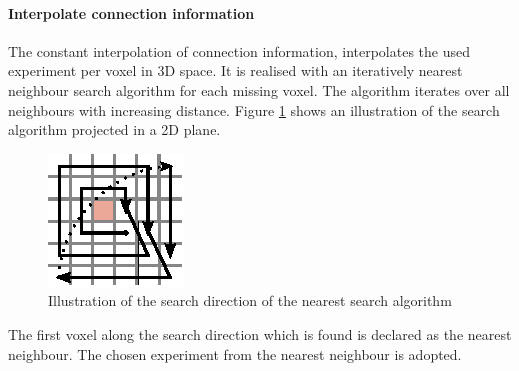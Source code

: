 \paragraph{Interpolate connection information}
\label{par:interpolation}
The constant interpolation of connection information, interpolates the used experiment per voxel in 3D space.
It is realised with an iteratively nearest neighbour search algorithm for each missing voxel.
The algorithm iterates over all neighbours with increasing distance.
Figure \ref{longrange} shows an illustration of the search algorithm
projected in a 2D plane.
\begin{figure}[ht!]
\centering
\includegraphics[scale=2.5]{pictures/longRange_Nearest_parallelAlg.eps}
\caption{Illustration of the search direction of the nearest search algorithm}
\label{longrange}
\end{figure}
The first voxel along the search direction which is found is declared as the nearest neighbour.
The chosen experiment from the nearest neighbour is adopted.

